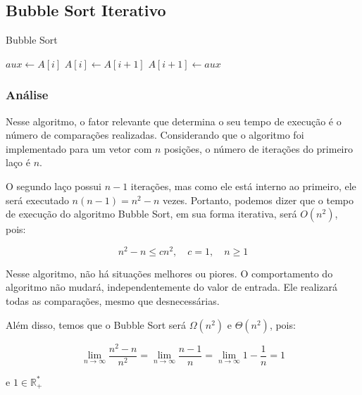\FloatBarrier

\newpage

\subsection{Bubble Sort Iterativo}

\begin{algorithm}
    \caption{Bubble Sort}
    \label{algo:bubble_sort}
    \begin{algorithmic}[1]
        \Statex
                    \State $aux \gets A[i]$ 
                    \State $A[i] \gets A[i + 1]$ 
                    \State $A[i + 1] \gets aux$ 
                \EndIf
            \EndFor
        \EndFor
        \EndFunction
    \end{algorithmic}
\end{algorithm}

\subsubsection{Análise}
Nesse algoritmo, o fator relevante que determina o seu tempo de execução é o número de comparações realizadas. Considerando que o algoritmo foi implementado para um vetor com \( n \) posições, o número de iterações do primeiro laço é \( n \).

O segundo laço possui \( n-1 \) iterações, mas como ele está interno ao primeiro, ele será executado \( n(n-1) = n^2 - n \) vezes. Portanto, podemos dizer que o tempo de execução do algoritmo Bubble Sort, em sua forma iterativa, será \( O(n^2) \), pois:

\[
n^2 - n \leq cn^2, \quad c = 1, \quad n \geq 1
\]

Nesse algoritmo, não há situações melhores ou piores. O comportamento do algoritmo não mudará, independentemente do valor de entrada. Ele realizará todas as comparações, mesmo que desnecessárias.

Além disso, temos que o Bubble Sort será \( \Omega(n^2) \) e \( \Theta(n^2) \), pois:

\[
\lim_{n \rightarrow \infty} \frac{n^2 - n}{n^2} =
\lim_{n \rightarrow \infty} \frac{n - 1}{n} =
\lim_{n \rightarrow \infty} 1-\frac{1}{n} =
1
\]

e $1 \in \mathbb{R}^*_+$


